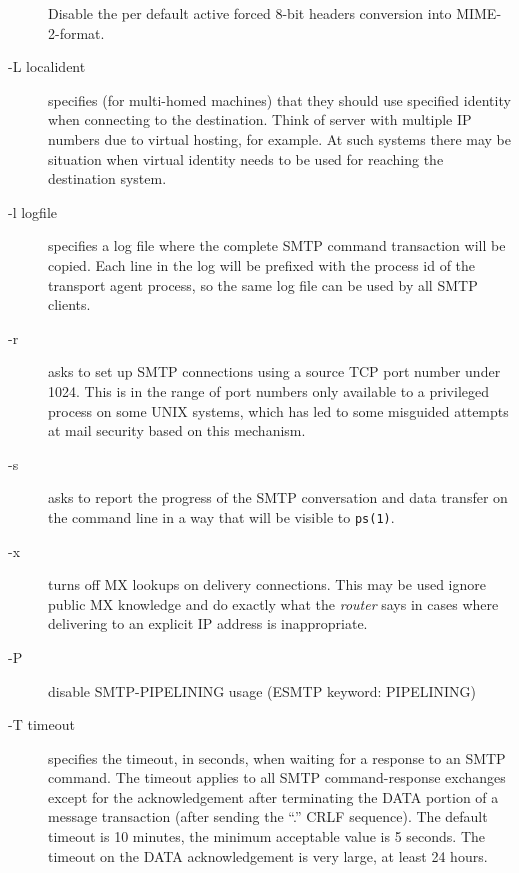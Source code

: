 \begin{description}
Disable the per default active forced 8-bit headers
conversion into MIME-2-format.



\item[-L localident] \mbox{}

specifies (for multi-homed machines) that they
should use specified identity when connecting to
the destination. Think of server with multiple IP
numbers due to virtual hosting, for example. At
such systems there may be situation when virtual
identity needs to be used for reaching the destination system.



\item[-l logfile] \mbox{}

specifies a log file where the complete SMTP command 
transaction will be copied. Each line in the
log will be prefixed with the process id of the
transport agent process, so the same log file can
be used by all SMTP clients.



\item[-r] \mbox{}

asks to set up SMTP connections using a source TCP
port number under 1024. This is in the range of
port numbers only available to a privileged process
on some UNIX systems, which has led to some 
misguided attempts at mail security based on this
mechanism.



\item[-s] \mbox{}

asks to report the progress of the SMTP conversation 
and data transfer on the command line in a way
that will be visible to {\tt ps(1)}.



\item[-x] \mbox{}

turns off MX lookups on delivery connections. This
may be used ignore public MX knowledge and do
exactly what the {\em router\/} says in cases where delivering 
to an explicit IP address is inappropriate.



\item[-P] \mbox{}

disable SMTP-PIPELINING usage (ESMTP keyword: PIPELINING)



\item[-T timeout] \mbox{}

specifies the timeout, in seconds, when waiting for
a response to an SMTP command. The timeout applies
to all SMTP command-response exchanges except for
the acknowledgement after terminating the DATA portion 
of a message transaction (after sending the
``.'' CRLF sequence). The default timeout is 10 
minutes, the minimum acceptable value is 5 seconds.
The timeout on the DATA acknowledgement is very
large, at least 24 hours.




\end{description}
